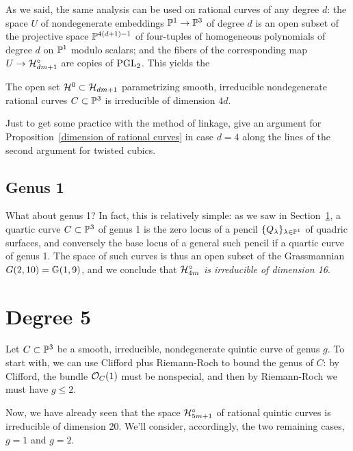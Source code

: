 As we said, the same analysis can be used on rational curves of any degree $d$: the space $U$ of nondegenerate embeddings $\PP^1 \to \PP^3$ of degree $d$ is an open subset of the projective space $\PP^{4(d+1)-1}$ of four-tuples of homogeneous polynomials of degree $d$ on $\PP^1$ modulo scalars; and the fibers of the corresponding map $U \to \cH^\circ_{dm+1}$ are copies of $\PGL_2$. This yields the

\begin{proposition}\label{dimension of rational curves}
The open set $\cH^0 \subset \cH_{dm+1}$ parametrizing smooth, irreducible nondegenerate rational curves $C \subset \PP^3$ is irreducible of dimension $4d$.
\end{proposition}

\begin{exercise}
Just to get some practice with the method of linkage, give an argument for Proposition~\ref{dimension of rational curves} in case $d=4$ along the lines of the second argument for twisted cubics.
\end{exercise}

\subsection{Genus 1}

What about genus 1? In fact, this is relatively simple: as we saw in Section~\ref{}, a quartic curve $C \subset \PP^3$ of genus 1 is the zero locus of a pencil $\{Q_\lambda\}_{\lambda \in \PP^1}$ of quadric surfaces, and conversely the base locus of a general such pencil if a quartic curve of genus 1. The space of such curves is thus an open subset of the Grassmannian $G(2,10) = \GG(1,9)$, and we conclude that \emph{$\cH^\circ_{4m}$ is irreducible of dimension 16}.

\section{Degree 5}

Let $C \subset \PP^3$ be a smooth, irreducible, nondegenerate quintic curve of genus $g$. To start with, we can use Clifford plus Riemann-Roch to bound the genus of $C$: by Clifford, the bundle $\cO_C(1)$ must be nonspecial, and then by Riemann-Roch we must have $g \leq 2$.

Now, we have already seen that the space $\cH^\circ_{5m+1}$ of rational quintic curves is irreducible of dimension 20. We'll consider, accordingly, the two remaining cases, $g=1$ and $g=2$.

